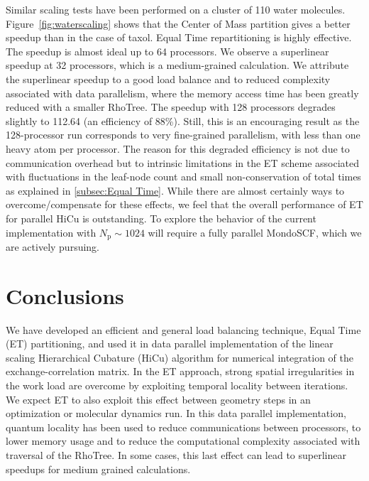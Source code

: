 \commentoutA{\documentclass[prl,aps,twocolumn,showpacs,twocolumngrid,superbib]{revtex4}}
\newcommand{\Np}{N_{\mathrm{p}}} \newcommand{\Nbox}{N_{\mathrm{b}}}
\begin{document}
Similar scaling tests have been performed on a cluster of 110 water
molecules.  Figure~\ref{fig:waterscaling} shows that the Center of
Mass partition gives a better speedup than in the case of taxol.
Equal Time repartitioning is highly effective.  The speedup
is almost ideal up to 64 processors. We observe a superlinear speedup
at 32 processors, which is a medium-grained calculation.  We attribute
the superlinear speedup to a good load balance and to reduced
complexity associated with data parallelism, where the memory access
time has been greatly reduced with a smaller RhoTree.  The speedup
with 128 processors degrades slightly to 112.64 (an efficiency of
88\%).  Still, this is an encouraging result as the 128-processor run
corresponds to very fine-grained parallelism, with less than one heavy
atom per processor. The reason for this degraded efficiency is not due
to communication overhead but to intrinsic limitations in the ET
scheme associated with fluctuations in the leaf-node count and small
non-conservation of total times as explained in
\ref{subsec:Equal Time}.  While there are almost certainly ways to
overcome/compensate for these effects, we feel that the overall
performance of ET for parallel HiCu is outstanding.  To explore
the behavior of the current implementation with $\Np \sim 1024 $ will 
require a fully parallel {\sc MondoSCF}, which we are actively pursuing.

\section{Conclusions}
\label{sec:conclusions}

We have developed an efficient and general load balancing technique,
Equal Time (ET) partitioning, and used it in data parallel
implementation of the linear scaling Hierarchical Cubature (HiCu)
algorithm for numerical integration of the exchange-correlation
matrix.  In the ET approach, strong spatial irregularities in the work
load are overcome by exploiting temporal locality between iterations.
We expect ET to also exploit this effect between geometry steps in an
optimization or molecular dynamics run.  In this data parallel
implementation, quantum locality has been used to reduce
communications between processors, to lower memory usage and to reduce
the computational complexity associated with traversal of the RhoTree.
In some cases, this last effect can lead to superlinear speedups for
medium grained calculations.
\end{document}
